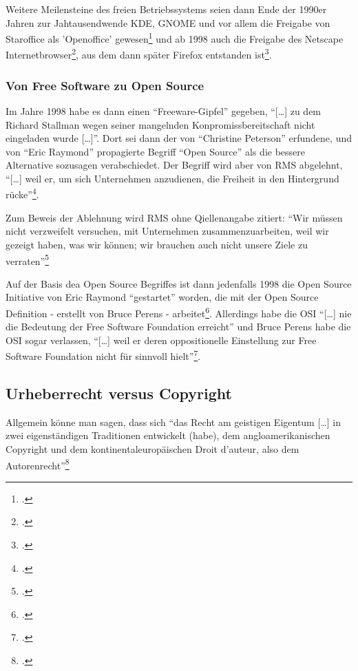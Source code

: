 \documentclass[DIV=calc,BCOR=5mm,11pt,headings=small,oneside,abstract=true, toc=bib]{scrartcl}
\begin{document}
Weitere Meilensteine des freien Betriebssystems seien dann Ende der 1990er
Jahren zur Jahtausendwende KDE, GNOME und vor allem die Freigabe von Staroffice
als 'Openoffice' gewesen\footcite[vgl.][38]{Viesel2006a} und ab 1998 auch die
Freigabe des Netscape Internetbrowser\footcite[vgl.][41]{Viesel2006a}, aus dem
dann später Firefox entstanden ist\footcite[vgl.][41]{Viesel2006a}.


\subsubsection{Von Free Software zu Open Source}

Im Jahre 1998 habe es dann einen \enquote{Freeware-Gipfel} gegeben,
\enquote{[\ldots] zu dem Richard Stallman wegen seiner mangelnden
Konpromissbereitschaft nicht eingeladen wurde [\ldots]}. Dort sei dann der
von \enquote{Christine Peterson} erfundene, und von \enquote{Eric
Raymond} propagierte Begriff \enquote{Open Source} als die bessere
Alternative sozusagen verabschiedet. Der Begriff wird aber von RMS abgelehnt,
\enquote{[\ldots] weil er, um sich Unternehmen anzudienen, die Freiheit in
den Hintergrund rücke}\footcite[vgl.][41]{Viesel2006a}.

Zum Beweis der Ablehnung wird RMS ohne Qiellenangabe zitiert: \enquote{Wir
müssen nicht verzweifelt versuchen, mit Unternehmen zusammenzuarbeiten,
weil wir gezeigt haben, was wir können; wir brauchen auch nicht unsere
Ziele zu verraten}\footcite[vgl.][41]{Viesel2006a}

Auf der Basis dea Open Source Begriffes ist dann jedenfalls 1998 die Open Source
Initiative von Eric Raymond \enquote{gestartet} worden, die mit der Open
Source Definition - erstellt von Bruce Perens -
arbeitet\footcite[vgl.][41]{Viesel2006a}. Allerdings habe die OSI
\enquote{[\ldots] nie die Bedeutung der Free Software Foundation erreicht}
und Bruce Perens habe die OSI sogar verlassen, \enquote{[\ldots] weil er
deren oppositionelle Einstellung zur Free Software Foundation nicht für
sinnvoll hielt}\footcite[vgl.][41]{Viesel2006a}.

\subsection{Urheberrecht versus Copyright}

Allgemein könne man sagen, dass sich \enquote{das Recht am geistigen
Eigentum [\ldots] in zwei eigenständigen Traditionen entwickelt (habe),
dem angloamerikanischen Copyright und dem kontinentaleuropäischen Droit
d'auteur, also dem Autorenrecht}\footcite[vgl.][45]{Viesel2006a}
\end{document}
